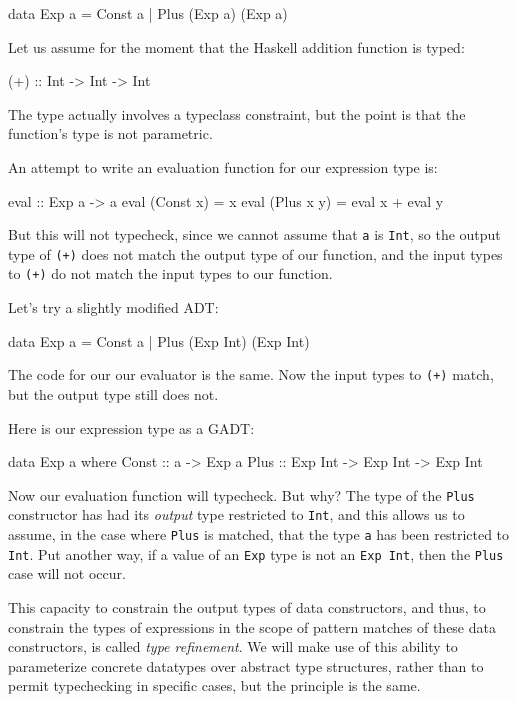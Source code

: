 \begin{code}
data Exp a = Const a | Plus (Exp a) (Exp a)
\end{code}

Let us assume for the moment that the Haskell addition function is typed:

\begin{code}
(+) :: Int -> Int -> Int
\end{code}

The type actually involves a typeclass constraint, but the point is that the
function's type is not parametric.

An attempt to write an evaluation function for our expression type is:

\begin{code}
eval :: Exp a -> a
eval (Const x) = x
eval (Plus x y) = eval x + eval y
\end{code}

But this will not typecheck, since we cannot assume that {\tt a} is {\tt Int},
so the output type of {\tt (+)} does not match the output type of our function,
and the input types to {\tt (+)} do not match the input types to our function.

Let's try a slightly modified ADT:

\begin{code}
data Exp a = Const a | Plus (Exp Int) (Exp Int)
\end{code}

The code for our our evaluator is the same. Now the input types to {\tt (+)}
match, but the output type still does not.

Here is our expression type as a GADT:
\begin{code}
data Exp a where
  Const  ::  a -> Exp a
  Plus   :: Exp Int -> Exp Int -> Exp Int
\end{code}

Now our evaluation function will typecheck. But why? The type of the {\tt Plus}
constructor has had its {\em output} type restricted to {\tt Int}, and this
allows us to assume, in the case where {\tt Plus} is matched, that the type
{\tt a} has been restricted to {\tt Int}. Put another way, if a value of an
{\tt Exp} type is not an {\tt Exp Int}, then the {\tt Plus} case will not occur.

This capacity to constrain the output types of data constructors, and thus, to
constrain the types of expressions in the scope of pattern matches of these data
constructors, is called {\em type refinement}. We will make use of this ability
to parameterize concrete datatypes over abstract type structures, rather than to
permit typechecking in specific cases, but the principle is the same.

